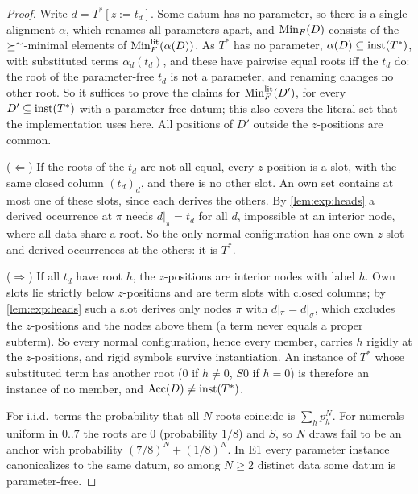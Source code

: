 \begin{proof}
Write $d=T^*[z:=t_d]$. Some datum has no parameter, so there is a single alignment $\alpha$, which renames all parameters apart, and $\mathrm{Min}_F(D)$ consists of the $\succeq^{\sim}$-minimal elements of $\mathrm{Min}^{\mathrm{lit}}_F(\alpha(D))$. As $T^*$ has no parameter, $\alpha(D)\subseteq\mathrm{inst}(T^*)$, with substituted terms $\alpha_d(t_d)$, and these have pairwise equal roots iff the $t_d$ do: the root of the parameter-free $t_d$ is not a parameter, and renaming changes no other root. So it suffices to prove the claims for $\mathrm{Min}^{\mathrm{lit}}_F(D')$, for every $D'\subseteq\mathrm{inst}(T^*)$ with a parameter-free datum; this also covers the literal set that the implementation uses here. All positions of $D'$ outside the $z$-positions are common.

($\Leftarrow$) If the roots of the $t_d$ are not all equal, every $z$-position is a slot, with the same closed column $(t_d)_d$, and there is no other slot. An own set contains at most one of these slots, since each derives the others. By \cref{lem:exp:heads} a derived occurrence at $\pi$ needs $d|_\pi=t_d$ for all $d$, impossible at an interior node, where all data share a root. So the only normal configuration has one own $z$-slot and derived occurrences at the others: it is $T^*$.

($\Rightarrow$) If all $t_d$ have root $h$, the $z$-positions are interior nodes with label $h$. Own slots lie strictly below $z$-positions and are term slots with closed columns; by \cref{lem:exp:heads} such a slot derives only nodes $\pi$ with $d|_\pi=d|_\sigma$, which excludes the $z$-positions and the nodes above them (a term never equals a proper subterm). So every normal configuration, hence every member, carries $h$ rigidly at the $z$-positions, and rigid symbols survive instantiation. An instance of $T^*$ whose substituted term has another root ($0$ if $h\neq0$, $S0$ if $h=0$) is therefore an instance of no member, and $\mathrm{Acc}(D)\neq\mathrm{inst}(T^*)$.

For i.i.d.\ terms the probability that all $N$ roots coincide is $\sum_hp_h^N$. For numerals uniform in $0..7$ the roots are $0$ (probability $1/8$) and $S$, so $N$ draws fail to be an anchor with probability $(7/8)^N+(1/8)^N$. In E1 every parameter instance canonicalizes to the same datum, so among $N\ge2$ distinct data some datum is parameter-free.
\end{proof}

